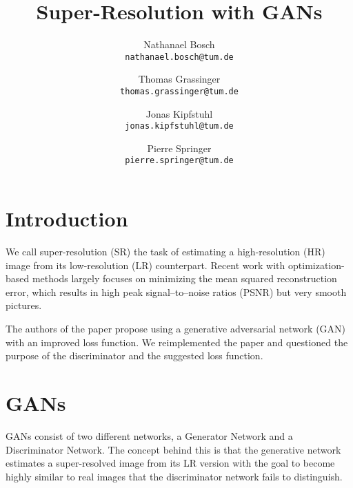 \documentclass[10pt,twocolumn,letterpaper]{article}
\begin{document}
\title{Super-Resolution with GANs}

\author{Nathanael Bosch\\
{\tt\small nathanael.bosch@tum.de}
\and
Thomas Grassinger\\
{\tt\small thomas.grassinger@tum.de}
\and
Jonas Kipfstuhl\\
{\tt\small jonas.kipfstuhl@tum.de}
\and
Pierre Springer\\
{\tt\small pierre.springer@tum.de}
}


\maketitle

\section{Introduction}
We call super-resolution (SR) the task of estimating a high-resolution
(HR) image from its low-resolution (LR) counterpart. Recent work with
optimization-based methods largely focuses on minimizing the mean
squared reconstruction error, which results in high peak
signal--to--noise ratios (PSNR) but very smooth pictures.

The authors of the paper\cite{LedigChristian2016PSIS} propose using a
generative adversarial network (GAN) with an improved loss function.
We reimplemented the paper and questioned the purpose of the
discriminator and the suggested loss function.

\section{GANs}
GANs consist of two different networks, a Generator Network and a
Discriminator Network. The concept behind this is that the generative
network estimates a super-resolved image from its LR version with the
goal to become highly similar to real images that the discriminator
network fails to distinguish.
\end{document}
